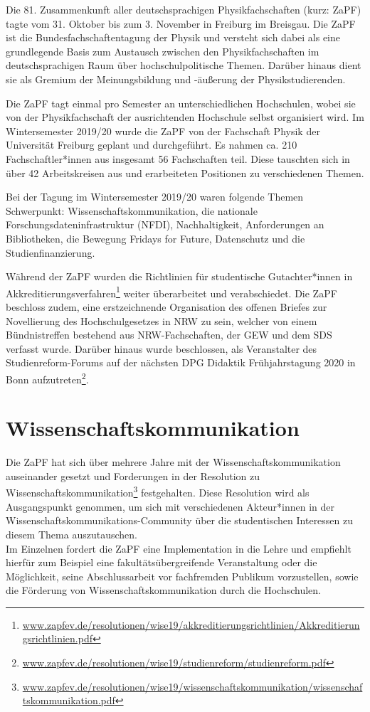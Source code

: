 Die 81. Zusammenkunft aller deutschsprachigen Physikfachschaften (kurz: ZaPF) tagte vom 31. Oktober bis zum 3. November in Freiburg im Breisgau. Die ZaPF ist die Bundesfachschaftentagung der Physik und versteht sich dabei als eine grundlegende Basis zum Austausch zwischen den Physikfachschaften im deutschsprachigen Raum über hochschulpolitische Themen. Darüber hinaus dient sie als Gremium der Meinungsbildung und -äußerung der Physikstudierenden.

Die ZaPF tagt einmal pro Semester an unterschiedlichen Hochschulen, wobei sie von der Physikfachschaft der ausrichtenden Hochschule selbst organisiert wird. 
Im Wintersemester 2019/20 wurde die ZaPF von der Fachschaft Physik der Universität Freiburg geplant und durchgeführt.  
Es nahmen ca. 210 Fachschaftler*innen aus insgesamt 56 Fachschaften teil.
Diese tauschten sich in über 42 Arbeitskreisen aus und erarbeiteten Positionen zu verschiedenen Themen.

Bei der Tagung im Wintersemester 2019/20 waren folgende Themen Schwerpunkt: Wissenschaftskommunikation, die nationale Forschungsdateninfrastruktur (NFDI), Nachhaltigkeit, Anforderungen an Bibliotheken, die Bewegung Fridays for Future, Datenschutz und die Studienfinanzierung. 

Während der ZaPF wurden die Richtlinien für studentische Gutachter*innen in Akkreditierungsverfahren\footnote{\href{https://zapfev.de/resolutionen/wise19/akkreditierungsrichtlinien/Akkreditierungsrichtlinien.pdf}{www.zapfev.de/resolutionen/wise19/akkreditierungsrichtlinien/Akkreditierungsrichtlinien.pdf}} weiter überarbeitet und verabschiedet. Die ZaPF beschloss zudem, eine erstzeichnende Organisation des offenen Briefes zur Novellierung des Hochschulgesetzes in NRW zu sein, welcher von einem Bündnistreffen bestehend aus NRW-Fachschaften, der GEW und dem SDS verfasst wurde. Darüber hinaus wurde beschlossen, als Veranstalter des Studienreform-Forums auf der nächsten DPG Didaktik Frühjahrstagung 2020 in Bonn aufzutreten\footnote{\href{https://zapfev.de/resolutionen/wise19/studienreform/studienreform.pdf}{www.zapfev.de/resolutionen/wise19/studienreform/studienreform.pdf}}.

\section*{Wissenschaftskommunikation}
Die ZaPF hat sich über mehrere Jahre mit der Wissenschaftskommunikation auseinander gesetzt und Forderungen in der Resolution zu Wissenschaftskommunikation\footnote{\href{https://zapfev.de/resolutionen/wise19/wissenschaftskommunikation/wissenschaftskommunikation.pdf}{www.zapfev.de/resolutionen/wise19/wissenschaftskommunikation/wissenschaftskommunikation.pdf}} festgehalten. Diese Resolution wird als Ausgangspunkt genommen, um sich mit verschiedenen Akteur*innen in der Wissenschaftskommunikations-Community über die studentischen Interessen zu diesem Thema auszutauschen.\\
Im Einzelnen fordert die ZaPF eine Implementation in die Lehre und empfiehlt hierfür zum Beispiel eine fakultätsübergreifende Veranstaltung oder die Möglichkeit, seine Abschlussarbeit vor fachfremden Publikum vorzustellen, sowie die Förderung von Wissenschaftskommunikation durch die Hochschulen.

